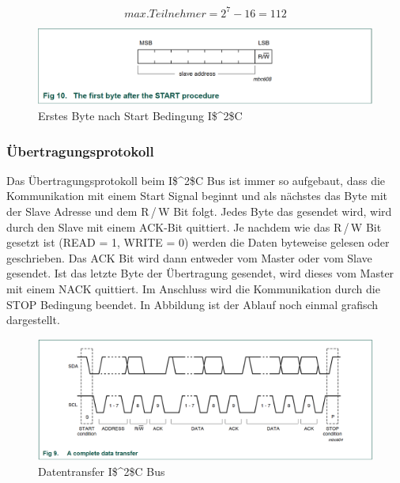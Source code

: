 \begin{equation}
max. Teilnehmer = 2^7-16 = 112
\label{Formel_Max_Teilnehmer_I2C}
\end{equation}

\begin{figure}[!h] 
  \centering
     \includegraphics[scale=.65]{BilderAllgemein/I2C_slave_address.png}
  \caption{Erstes Byte nach Start Bedingung \ac{I$^2$C}  \citep[S. 13]{I2C_Datenblatt}}
  \label{Abb_Bild_I2C_Slave_Adresse}
\end{figure}

\subsubsection{Übertragungsprotokoll}
\label{subsubsection_Übertragungsprotokoll_I2C}
Das Übertragungsprotokoll beim \ac{I$^2$C} Bus ist immer so aufgebaut, dass die Kommunikation mit einem Start Signal beginnt und als nächstes das Byte mit der Slave Adresse und dem R\,/\,W Bit folgt. Jedes Byte das gesendet wird, wird durch den Slave mit einem ACK-Bit quittiert. Je nachdem wie das R\,/\,W Bit gesetzt ist (READ = 1, WRITE = 0) werden die Daten byteweise gelesen oder geschrieben. Das ACK Bit wird dann entweder vom Master oder vom Slave gesendet. Ist das letzte Byte der Übertragung gesendet, wird dieses vom Master mit einem NACK quittiert. Im Anschluss wird die Kommunikation durch die STOP Bedingung beendet. In Abbildung ist der Ablauf noch einmal grafisch dargestellt.\newpage

\begin{figure}[h!] 
  \centering
     \includegraphics[scale=.53]{BilderAllgemein/I2C_data_transfer.png}
  \caption{Datentransfer \ac{I$^2$C} Bus  \citep[S. 13]{I2C_Datenblatt}}
  \label{Abb_Bild_I2C_Slave_Adresse}
\end{figure}
\newpage

